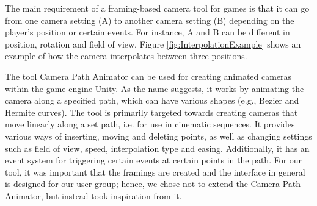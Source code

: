 The main requirement of a framing-based camera tool for games is that it can go from one camera setting (A) to another camera setting (B) depending on the player's position or certain events. For instance, A and B can be different in position, rotation and field of view.
Figure \ref{fig:InterpolationExample} shows an example of how the camera interpolates between three positions.


The tool Camera Path Animator \cite{unity_camTool} can be used for creating animated cameras within the game engine Unity. As the name suggests, it works by animating the camera along a specified path, which can have various shapes (e.g., Bezier and Hermite curves). The tool is primarily targeted towards creating cameras that move linearly along a set path, i.e. for use in cinematic sequences. It provides various ways of inserting, moving and deleting points, as well as changing settings such as field of view, speed, interpolation type and easing. Additionally, it has an event system for triggering certain events at certain points in the path. For our tool, it was important that the framings are created and the interface in general is designed for our user group; hence, we chose not to extend the Camera Path Animator, but instead took inspiration from it.




